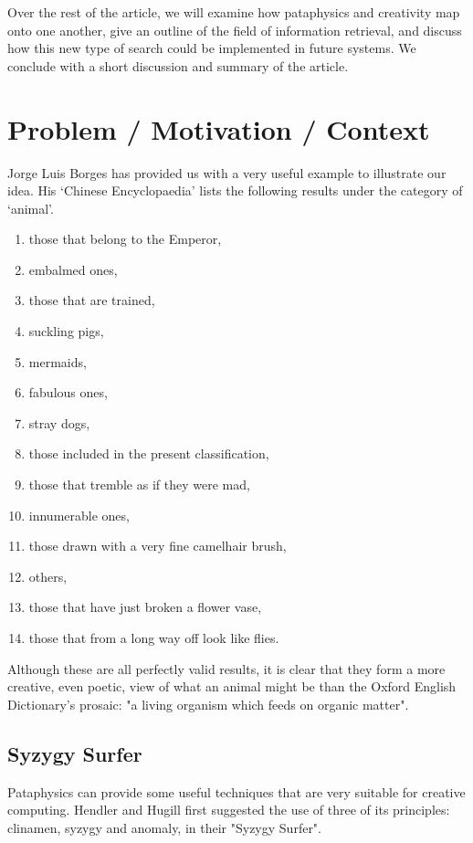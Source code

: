 Over the rest of the article, we will examine how pataphysics and creativity map onto one another, give an outline of the field of information retrieval, and discuss how this new type of search could be implemented in future systems. We conclude with a short discussion and summary of the article.

\section{Problem / Motivation / Context}

Jorge Luis Borges has provided us with a very useful example to illustrate our idea. His ‘Chinese Encyclopaedia' \citep{Borges2000} lists the following results under the category of ‘animal'.

\begin{enumerate}
  \item those that belong to the Emperor,
  \item embalmed ones,
  \item those that are trained,
  \item suckling pigs,
  \item mermaids,
  \item fabulous ones,
  \item stray dogs,
  \item those included in the present classification,
  \item those that tremble as if they were mad,
  \item innumerable ones,
  \item those drawn with a very fine camelhair brush,
  \item others,
  \item those that have just broken a flower vase,
  \item those that from a long way off look like flies.
\end{enumerate}

Although these are all perfectly valid results, it is clear that they form a more creative, even poetic, view of what an animal might be than the Oxford English Dictionary's prosaic: "a living organism which feeds on organic matter".

\subsection{Syzygy Surfer}

Pataphysics can provide some useful techniques that are very suitable for creative computing. Hendler and Hugill first suggested the use of three of its principles: clinamen, syzygy and anomaly, in their "Syzygy Surfer".

